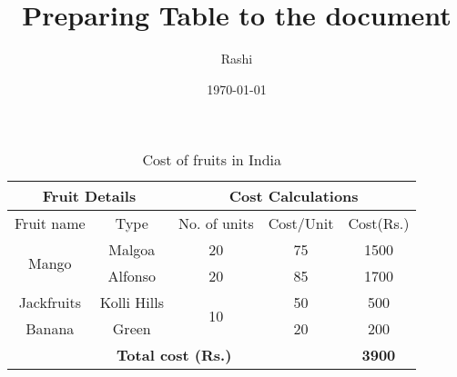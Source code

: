 \documentclass[twocolumn]{article}
\begin{document}
	\title{Preparing Table to the document}
	\author{Rashi}
	\date{\today}
	\maketitle
	\blindtext[2]
	\begin{table*}[t]
		\centering
		\caption{Cost of fruits in India}
		\vspace{0.5cm}
		\begin{tabular}{||c|c|c|c|c||}
			\hline
			\multicolumn{2}{||c|}{Fruit Details} & \multicolumn{3}{c||}{Cost Calculations} \\ \hline
			Fruit name & Type & No. of units & Cost/Unit & Cost(Rs.) \\ \hline
			\multirow[t]{2}{*}{Mango} & Malgoa & 20 & 75 & 1500 \\ \cline{2-5}
			& Alfonso & 20 & 85 & 1700 \\ \hline
			Jackfruits & Kolli Hills & \multirow[t]{2}{*}{10} & 50 & 500 \\ \cline{1-2} \cline{4-5} 
			Banana & Green & & 20 & 200 \\ \hline
			\multicolumn{4}{||c|}{\textbf{Total cost (Rs.)}} & \textbf{3900} \\ \hline
		\end{tabular}
	\end{table*}
	\blindtext[7]
\end{document}
